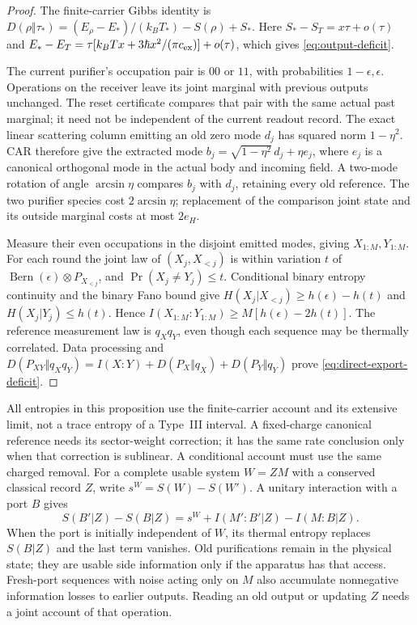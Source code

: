 \begin{proof}
The finite-carrier Gibbs identity is
$D(\rho\Vert\tau_*)=(E_\rho-E_*)/(k_BT_*)-S(\rho)+S_*$.
Here $S_*-S_T=x\tau+o(\tau)$ and
$E_*-E_T=\tau[k_BTx+3\hbar x^2/(\pi c_{\rm ex})]+o(\tau)$,
which gives \eqref{eq:output-deficit}.

The current purifier's occupation pair is $00$ or $11$, with
probabilities $1-\epsilon,\epsilon$. Operations on the receiver
leave its joint marginal with previous outputs unchanged. The reset
certificate compares that pair with the same actual past marginal;
it need not be independent of the current readout record.
The exact linear scattering column emitting an old zero mode $d_j$
has squared norm $1-\eta^2$. CAR therefore give the extracted mode
$b_j=\sqrt{1-\eta^2}\,d_j+\eta e_j$, where $e_j$ is a canonical
orthogonal mode in the actual body and incoming field. A two-mode
rotation of angle $\arcsin\eta$ compares $b_j$ with $d_j$, retaining
every old reference. The two purifier species cost $2\arcsin\eta$;
replacement of the comparison joint state and its outside marginal
costs at most $2e_H$.

Measure their even occupations in the disjoint emitted modes, giving
$X_{1:M},Y_{1:M}$. For each round the joint law of $(X_j,X_{<j})$
is within variation $t$ of
$\operatorname{Bern}(\epsilon)\otimes P_{X_{<j}}$, and
$\Pr(X_j\ne Y_j)\le t$. Conditional binary entropy continuity and
the binary Fano bound give
$H(X_j|X_{<j})\ge h(\epsilon)-h(t)$ and
$H(X_j|Y_j)\le h(t)$. Hence
$I(X_{1:M}:Y_{1:M})\ge M[h(\epsilon)-2h(t)]$.
The reference measurement law is $q_Xq_Y$, even though each sequence
may be thermally correlated. Data processing and
$D(P_{XY}\Vert q_Xq_Y)=I(X:Y)+D(P_X\Vert q_X)+D(P_Y\Vert q_Y)$
prove \eqref{eq:direct-export-deficit}.
\end{proof}

All entropies in this proposition use the finite-carrier account and
its extensive limit, not a trace entropy of a Type~III interval.
A fixed-charge canonical reference needs its sector-weight correction;
it has the same rate conclusion only when that correction is
sublinear. A conditional account must use the same charged removal.
For a complete usable system $W=ZM$ with a conserved classical record
$Z$, write $s^W=S(W)-S(W')$. A unitary interaction with a port $B$ gives
\[
 S(B'|Z)-S(B|Z)
 =s^W+I(M':B'|Z)-I(M:B|Z).
\]
When the port is initially independent of $W$, its thermal entropy
replaces $S(B|Z)$ and the last term vanishes. Old purifications remain
in the physical state; they are usable side information only if the
apparatus has that access. Fresh-port sequences with noise acting only
on $M$ also accumulate nonnegative information losses to earlier
outputs. Reading an old output or updating $Z$ needs a joint account
of that operation.

